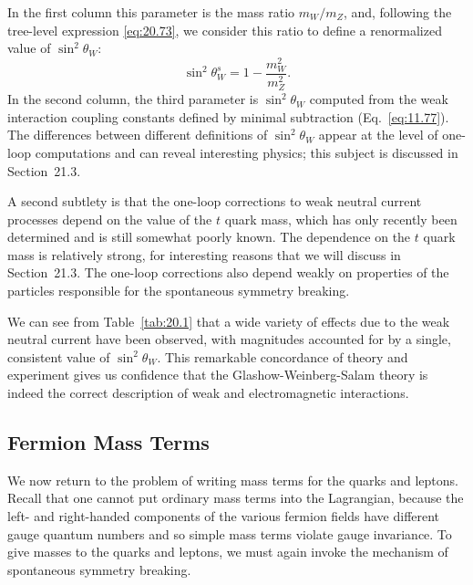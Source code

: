 In the first column this parameter is the mass ratio $m_W/m_Z$, and, following
the tree-level expression \eqref{eq:20.73}, we consider this ratio to define a
renormalized value of $\sin^2\theta_W$:
\begin{equation}
  \sin^2\theta^s_W = 1 - \frac{m_W^2}{m_Z^2} .
  \label{eq:20.97}
\end{equation}
In the second column, the third parameter is $\sin^2\theta_W$ computed from
the weak interaction coupling constants defined by minimal subtraction
(Eq.~\eqref{eq:11.77}).  The differences between different definitions of
$\sin^2\theta_W$ appear at the level of one-loop computations and can reveal
interesting physics; this subject is discussed in Section~21.3.

A second subtlety is that the one-loop corrections to weak neutral current
processes depend on the value of the $t$ quark mass, which has only recently
been determined and is still somewhat poorly known.  The dependence on the
$t$ quark mass is relatively strong, for interesting reasons that we will
discuss in Section~21.3.  The one-loop corrections also depend weakly on
properties of the particles responsible for the spontaneous symmetry
breaking.

We can see from Table~\ref{tab:20.1} that a wide variety of effects due to
the weak neutral current have been observed, with magnitudes accounted for by
a single, consistent value of $\sin^2\theta_W$.  This remarkable concordance
of theory and experiment gives us confidence that the Glashow-Weinberg-Salam
theory is indeed the correct description of weak and electromagnetic
interactions.

\subsection{Fermion Mass Terms}

We now return to the problem of writing mass terms for the quarks and
leptons.  Recall that one cannot put ordinary mass terms into the Lagrangian,
because the left- and right-handed components of the various fermion fields
have different gauge quantum numbers and so simple mass terms violate gauge
invariance.  To give masses to the quarks and leptons, we must again invoke
the mechanism of spontaneous symmetry breaking.

